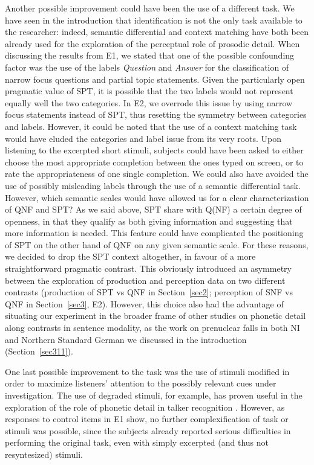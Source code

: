 Another possible improvement could have been the use of a different task. We have seen in the introduction that identification is not the only task available to the researcher: indeed, semantic differential and context matching have both been already used for the exploration of the perceptual role of prosodic detail. When discussing the results from E1, we stated that one of the possible confounding factor was the use of the labels \textit{Question} and \textit{Answer} for the classification of narrow focus questions and partial topic statements. Given the particularly open pragmatic value of SPT, it is possible that the two labels would not represent equally well the two categories. In E2, we overrode this issue by using narrow focus statements instead of SPT, thus resetting the symmetry between categories and labels. However, it could be noted that the use of a context matching task would have eluded the categories and label issue from its very roots. Upon listening to the excerpted short stimuli, subjects could have been asked to either choose the most appropriate completion between the ones typed on screen, or to rate the appropriateness of one single completion. We could also have avoided the use of possibly misleading labels through the use of a semantic differential task. However, which semantic scales would have allowed us for a clear characterization of QNF and SPT? As we said above, SPT share with Q(NF) a certain degree of openness, in that they qualify as both giving information and suggesting that more information is needed. This feature could have complicated the positioning of SPT on the other hand of QNF on any given semantic scale. For these reasons, we decided to drop the SPT context altogether, in favour of a more straightforward pragmatic contrast. This obviously introduced an asymmetry between the exploration of production and perception data on two different contrasts (production of SPT vs QNF in Section~\ref{sec2}; perception of SNF vs QNF in Section~\ref{sec3}, E2). However, this choice also had the advantage of situating our experiment in the broader frame of other studies on phonetic detail along contrasts in sentence modality, as the work on prenuclear falls in both NI and Northern Standard German we discussed in the introduction (Section~\ref{sec311}).

One last possible improvement to the task was the use of stimuli modified in order to maximize listeners' attention to the possibly relevant cues under investigation. The use of degraded stimuli, for example, has proven useful in the exploration of the role of phonetic detail in talker recognition \citep{sheffert2002learning}. However, as responses to control items in E1 show, no further complexification of task or stimuli was possible, since the subjects already reported serious difficulties in performing the original task, even with simply excerpted (and thus not resyntesized) stimuli.

